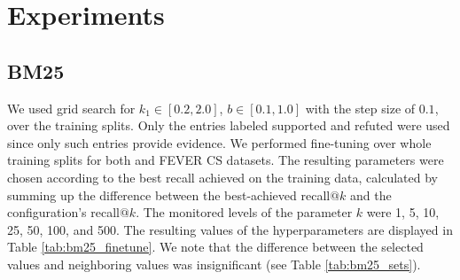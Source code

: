 \chapter{Experiments}

\section{BM25}

We used grid search for $k_1 \in [0.2,2.0]$, $b\in[0.1,1.0]$ with the step size of $0.1$, over the training splits.
Only the entries labeled supported and refuted were used since only such entries provide evidence.
We performed fine-tuning over whole training splits for both \CTK{} and FEVER CS datasets.
The resulting parameters were chosen according to the best recall achieved on the training data, calculated by summing up the difference between the best-achieved recall$@k$ and the configuration's recall$@k$.
The monitored levels of the parameter $k$ were 1, 5, 10, 25, 50, 100, and 500. 
The resulting values of the hyperparameters are displayed in Table \ref{tab:bm25_finetune}. 
We note that the difference between the selected values and neighboring values was insignificant (see Table \ref{tab:bm25_sets}). 

